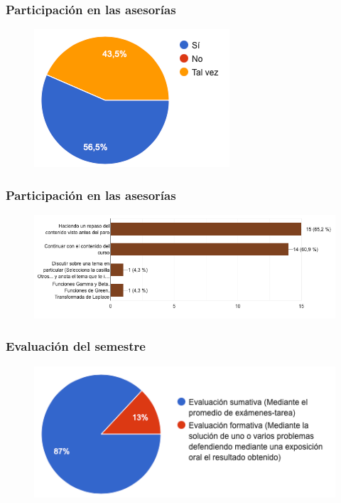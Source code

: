 \begin{frame}
\frametitle{Participación en las asesorías}
\begin{figure}
    \centering
    \includegraphics[scale=0.6]{Imagenes/Encuesta_Asesorias_03.png}
\end{figure}
\end{frame}
\begin{frame}
\frametitle{Participación en las asesorías}
\begin{figure}
    \hspace*{-0.4cm}
    \centering
    \includegraphics[scale=0.45]{Imagenes/Encuesta_Asesorias_04.png}
\end{figure}
\end{frame}
\begin{frame}
\frametitle{Evaluación del semestre}
\begin{figure}
    \centering
    \includegraphics[scale=0.6]{Imagenes/Encuesta_Asesorias_05.png}
\end{figure}
\end{frame}

